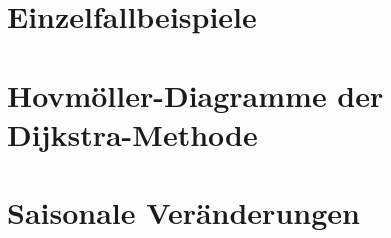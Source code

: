 

\usepackage{printlen}




\frontmatter
{}   %


\newpage
\thispagestyle{empty}
\quad
\newpage
\thispagestyle{empty}
\tableofcontents  %
\listoffigures    %
\listoftables     %
%
\mainmatter %







% 
% 
% 
%
% 
% 




\appendix
\chapter{Einzelfallbeispiele}
\chapter{Hovmöller-Diagramme der Dijkstra-Methode}
\chapter{Saisonale Veränderungen}



